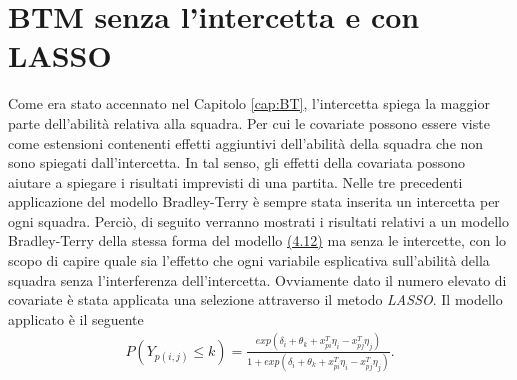 \section{BTM senza l'intercetta e con LASSO}
Come era stato accennato nel Capitolo \ref{cap:BT}, l'intercetta spiega la maggior parte dell'abilità relativa alla squadra. Per cui le covariate possono essere viste come estensioni contenenti effetti aggiuntivi dell'abilità della squadra che non sono spiegati dall'intercetta. In tal senso, gli effetti della covariata possono aiutare a spiegare i risultati imprevisti di una partita. Nelle tre precedenti applicazione del modello Bradley-Terry è sempre stata inserita un intercetta per ogni squadra. Perciò, di seguito verranno mostrati i risultati relativi a un modello Bradley-Terry della stessa forma del modello \hyperref[for:4.9]{(4.12)} ma senza le intercette, con lo scopo di capire quale sia l'effetto che ogni variabile esplicativa sull'abilità della squadra senza l'interferenza dell'intercetta. Ovviamente dato il numero elevato di covariate è stata applicata una selezione attraverso il metodo \emph{LASSO}. Il modello applicato è il seguente
\begin{align}
	P(Y_{p(i,j)}\leq k) =  \frac{exp(\delta_i + \theta_{k} + x^T_{pi}\eta_i - x^T_{pj}\eta_j)}{1 + exp(\delta_i + \theta_{k} + x^T_{pi}\eta_i - x^T_{pj}\eta_j)}.\label{for:5.2}
\end{align}

